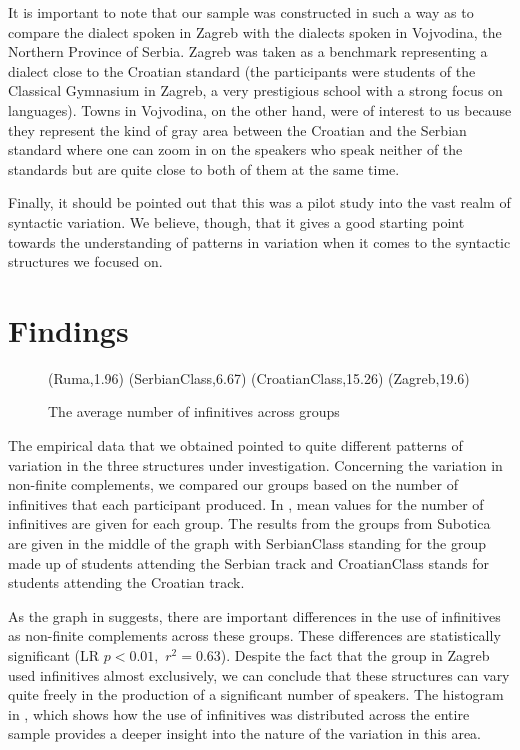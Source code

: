\documentclass[output=paper,
modfonts,
newtxmath,
hidelinks,
]{langscibook}
\begin{document}
It is important to note that our sample was constructed in such a way as to compare the dialect spoken in Zagreb with the dialects spoken in Vojvodina, the Northern Province of Serbia. Zagreb was taken as a benchmark representing a dialect close to the Croatian standard (the participants were students of the Classical Gymnasium in Zagreb, a very prestigious school with a strong focus on languages). Towns in Vojvodina, on the other hand, were of interest to us because they represent the kind of gray area between the Croatian and the Serbian standard where one can zoom in on the speakers who speak neither of the standards but are quite close to both of them at the same time.

Finally, it should be pointed out that this was a pilot study into the vast realm of syntactic variation. We believe, though, that it gives a good starting point towards the understanding of patterns in variation when it comes to the syntactic structures we focused on.\largerpage

\section{Findings}\label{s3}

\begin{figure}[b]
\footnotesize
\textsf{ 
%
{
(Ruma,1.96)
(SerbianClass,6.67)
(CroatianClass,15.26)
(Zagreb,19.6)
}}
\caption{The average number of infinitives across groups}\label{fig:key:1}
\end{figure}


The empirical data that we obtained pointed to quite different patterns of variation in the three structures under investigation. Concerning the variation in non-finite complements, we compared our groups based on the number of infinitives that each participant produced. In , mean values for the number of infinitives are given for each group. The results from the groups from Subotica are given in the middle of the graph with \textsf{SerbianClass} standing for the group made up of students attending the Serbian track and 
\textsf{CroatianClass} stands for students attending the Croatian track.

As the graph in  suggests, there are important differences in the use of infinitives as non-finite complements across these groups. These differences are statistically significant (LR $p<0.01,$ $r^2 = 0.63$). Despite the fact that the group in Zagreb used infinitives almost exclusively, we can conclude that these structures can vary quite freely in the production of a significant number of speakers. The histogram in , which shows how the use of infinitives was distributed across the entire sample provides a deeper insight into the nature of the variation in this area.
\end{document}
